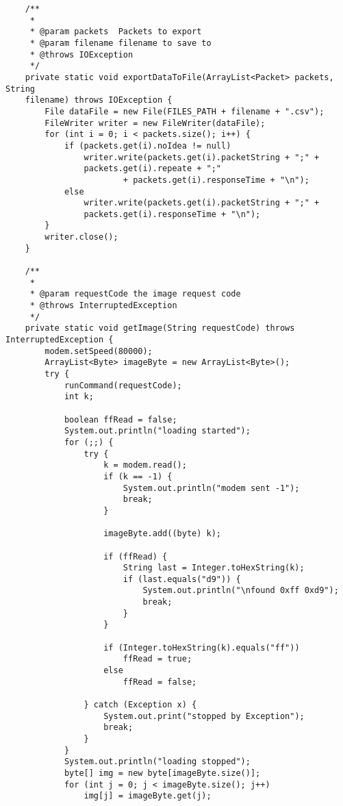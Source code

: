 \documentclass{article}
\begin{document}
\begin{verbatim}
    /**
     *
     * @param packets  Packets to export
     * @param filename filename to save to
     * @throws IOException
     */
    private static void exportDataToFile(ArrayList<Packet> packets, String
    filename) throws IOException {
        File dataFile = new File(FILES_PATH + filename + ".csv");
        FileWriter writer = new FileWriter(dataFile);
        for (int i = 0; i < packets.size(); i++) {
            if (packets.get(i).noIdea != null)
                writer.write(packets.get(i).packetString + ";" +
                packets.get(i).repeate + ";"
                        + packets.get(i).responseTime + "\n");
            else
                writer.write(packets.get(i).packetString + ";" +
                packets.get(i).responseTime + "\n");
        }
        writer.close();
    }

    /**
     *
     * @param requestCode the image request code
     * @throws InterruptedException
     */
    private static void getImage(String requestCode) throws InterruptedException {
        modem.setSpeed(80000);
        ArrayList<Byte> imageByte = new ArrayList<Byte>();
        try {
            runCommand(requestCode);
            int k;

            boolean ffRead = false;
            System.out.println("loading started");
            for (;;) {
                try {
                    k = modem.read();
                    if (k == -1) {
                        System.out.println("modem sent -1");
                        break;
                    }

                    imageByte.add((byte) k);

                    if (ffRead) {
                        String last = Integer.toHexString(k);
                        if (last.equals("d9")) {
                            System.out.println("\nfound 0xff 0xd9");
                            break;
                        }
                    }

                    if (Integer.toHexString(k).equals("ff"))
                        ffRead = true;
                    else
                        ffRead = false;

                } catch (Exception x) {
                    System.out.print("stopped by Exception");
                    break;
                }
            }
            System.out.println("loading stopped");
            byte[] img = new byte[imageByte.size()];
            for (int j = 0; j < imageByte.size(); j++)
                img[j] = imageByte.get(j);


\end{verbatim}
\end{document}
